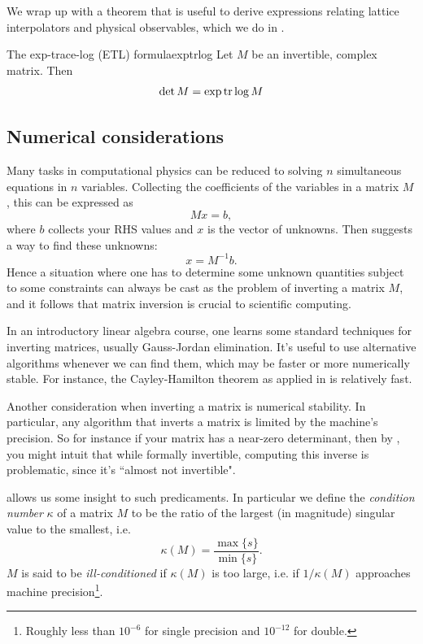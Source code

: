 We wrap up with a theorem that is useful to derive expressions relating
lattice interpolators and physical observables,
which we do in .
\begin{theorem}{The exp-trace-log (ETL) formula}{exptrlog}
  Let $M$ be an invertible, complex matrix. Then
  $$\det M = \exp \tr \log M$$
\end{theorem}


\subsection{Numerical considerations}\label{sec:numerics}


Many tasks in computational physics can be reduced to solving
$n$ simultaneous equations in $n$ variables. Collecting
the coefficients of the variables in a matrix $M$, this
can be expressed as
\begin{equation}\label{eq:solveGeneral}
Mx=b,
\end{equation}
where $b$ collects your RHS values and $x$ is the vector
of unknowns. Then  suggests a way
to find these unknowns:
\begin{equation}
x=M^{-1}b.
\end{equation}
Hence a situation where one has to determine some unknown
quantities subject to some constraints can always be cast
as the problem of inverting a matrix $M$, and it follows that
matrix inversion is crucial to scientific computing.

In an introductory linear algebra course,
one learns some standard techniques for inverting matrices,
usually Gauss-Jordan elimination. 
It's useful to use alternative algorithms whenever we can find them,
which may be faster or more numerically stable.
For instance, the Cayley-Hamilton theorem as applied
in  is relatively fast.

Another consideration when inverting a matrix is numerical
stability. In particular, any algorithm that inverts a matrix is
limited by the machine's precision. So for instance if your
matrix has a near-zero determinant, then by
, you might intuit that while
formally invertible, computing this inverse is problematic,
since it's ``almost not invertible".

 allows us some insight to such predicaments.
In particular we define the {\it condition number}
$\kappa$ of a matrix $M$ to be the ratio of the largest
(in magnitude) singular value to the smallest, i.e.
\begin{equation}
\kappa(M)=\frac{\max\{s\}}{\min\{s\}}.
\end{equation}
$M$ is said to be {\it ill-conditioned}
if $\kappa(M)$ is too large, i.e. if $1/\kappa(M)$ approaches
machine precision\footnote{Roughly less than $10^{-6}$ for
single precision and $10^{-12}$ for double.}.

